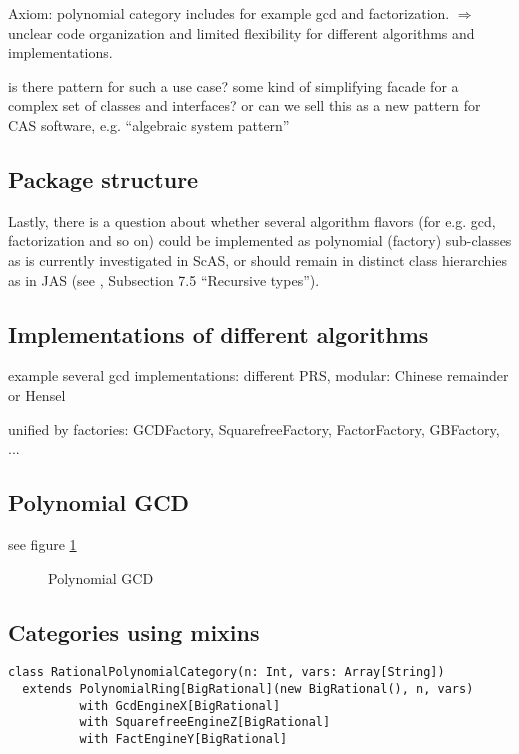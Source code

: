 \documentclass{llncs}
\begin{document}
Axiom: polynomial category includes for example gcd and factorization.
$\Longrightarrow$ unclear code organization and limited flexibility for
different algorithms and implementations.

is there pattern \cite{Gamma:1995} for such a use case? some kind of
simplifying facade for a complex set of classes and interfaces? or can
we sell this as a new pattern for CAS software, e.g. ``algebraic system pattern'' 



\subsection{Package structure} %

Lastly, there is a question about whether several algorithm flavors
(for e.g. gcd, factorization and so on) could be implemented as
polynomial (factory) sub-classes as is currently investigated in ScAS,
or should remain in distinct class hierarchies as in JAS (see
\cite{Kredel:2008}, Subsection 7.5 ``Recursive types'').


\subsection{Implementations of different algorithms} %

example several gcd implementations: different PRS, modular: Chinese
remainder or Hensel

unified by factories:
GCDFactory, SquarefreeFactory, FactorFactory, GBFactory, ...

\subsection{Polynomial GCD} %

see figure \ref{fig:poly}

\begin{figure}[thb]
\centering
{}
\caption{Polynomial GCD}
\label{fig:poly}
\end{figure}

\subsection{Categories using mixins} %


\begin{verbatim}
class RationalPolynomialCategory(n: Int, vars: Array[String])
  extends PolynomialRing[BigRational](new BigRational(), n, vars)
          with GcdEngineX[BigRational] 
          with SquarefreeEngineZ[BigRational]
          with FactEngineY[BigRational]
\end{verbatim}
\end{document}
